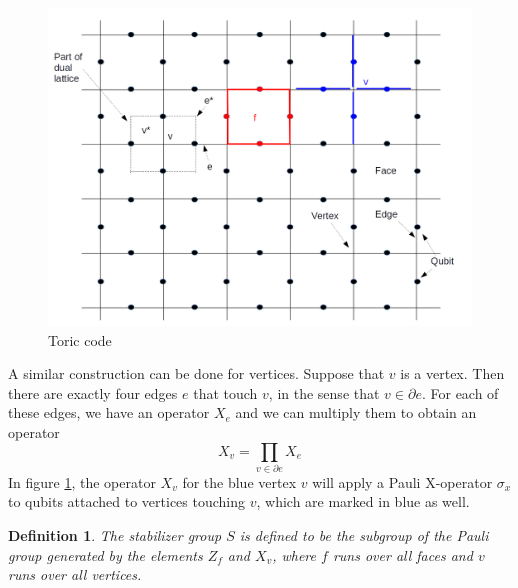 \documentclass[a4paper, draft]{article}
\theoremstyle{own}
\newtheorem{defn}{Definition}[section]
\theoremstyle{remark}
\begin{document}
\begin{figure}[ht]
\centering
\includegraphics[width=0.7\linewidth]{images/ToricCode}
\caption[Toric code]{Toric code}
\label{fig:ToricCode}
\end{figure}

A similar construction can be done for vertices. Suppose that $v$ is a vertex. Then there are exactly four edges $e$ that touch $v$, in the sense that $v \in \partial e$. For each of these edges, we have an operator $X_e$ and we can multiply them to obtain an operator
$$
X_v = \prod_{v \in \partial e} X_e
$$
In figure \ref{fig:ToricCode}, the operator $X_v$ for the blue vertex $v$ will apply a Pauli X-operator $\sigma_x$ to qubits attached to vertices touching $v$, which are marked in blue as well.

\begin{defn}
The stabilizer group $S$ is defined to be the subgroup of the Pauli group generated by the elements $Z_f$ and $X_v$, where $f$ runs over all faces and $v$ runs over all vertices.
\end{defn}
\end{document}
